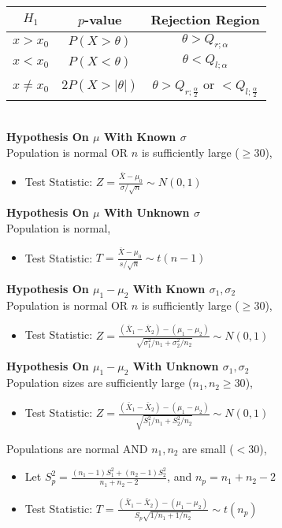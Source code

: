 \documentclass[a4paper, 12pt]{article}
\begin{document}
\begin{multicols*}{4}
\begin{enumerate}
\end{enumerate}
\begin{tabular}{ |c|c|c| }
    \hline
    $H_1$       & $p$-value        & Rejection Region \\ 
    \hline
    $x > x_0$   & $P(X>\theta)$    & $\theta>Q_{r;\alpha}$\\ 
    $x < x_0$   & $P(X<\theta)$    & $\theta<Q_{l;\alpha}$\\ 
    $x \ne x_0$ & $2P(X>|\theta|)$ & $\theta>Q_{r;\frac{\alpha}{2}}$ or $<Q_{l;\frac{\alpha}{2}}$\\ 
    \hline
\end{tabular}\\
\textbf{Hypothesis On $\mu$ With Known $\sigma$} \\
Population is normal OR $n$ is sufficiently large ($\geq 30$),
\begin{itemize}
    \item Test Statistic: $Z=\frac{\bar{X}-\mu_0}{\sigma/\sqrt{n}} \sim N(0,1)$ 
\end{itemize}
\textbf{Hypothesis On $\mu$ With Unknown $\sigma$}\\
Population is normal,
\begin{itemize}
    \item Test Statistic: $T = \frac{\bar{X}-\mu_0}{s/\sqrt{n}} \sim t(n-1)$
\end{itemize}
\textbf{Hypothesis On $\mu_1-\mu_2$ With Known $\sigma_1,\sigma_2$}\\
Population is normal OR $n$ is sufficiently large ($\geq 30$),
\begin{itemize}
    \item Test Statistic: $Z = \frac{(\bar{X}_1-\bar{X}_2)-(\mu_1-\mu_2)}{\sqrt{\sigma_1^2/n_1+\sigma_2^2/n_2}} \sim N(0,1)$
\end{itemize}
\textbf{Hypothesis On $\mu_1-\mu_2$ With Unknown $\sigma_1,\sigma_2$}\\
Population sizes are sufficiently large ($n_1,n_2 \geq 30$),
\begin{itemize}
    \item Test Statistic: $Z = \frac{(\bar{X}_1-\bar{X}_2)-(\mu_1-\mu_2)}{\sqrt{S_1^2/n_1+S_2^2/n_2}} \sim N(0,1)$
\end{itemize}
Populations are normal AND $n_1,n_2$ are small ($< 30$),
\begin{itemize}
    \item Let $S_p^2=\frac{(n_1-1)S_1^2+(n_2-1)S_2^2}{n_1+n_2-2}$, and $n_p=n_1+n_2-2$
    \item Test Statistic: $T=\frac{(\bar{X}_1-\bar{X}_2)-(\mu_1-\mu_2)}{S_p\sqrt{1/n_1+1/n_2}} \sim t(n_p)$

\end{itemize}
\end{multicols*}
\end{document}
